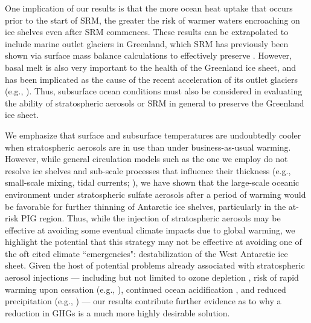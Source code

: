 \documentclass[grl]{AGUTeX}  %
\begin{document}
\begin{article}

One implication of our results is that the more ocean heat uptake that occurs prior to the start of SRM, the greater the risk of warmer waters encroaching on ice shelves even after SRM commences. These results can be extrapolated to include marine outlet glaciers in Greenland, which SRM has previously been shown via surface mass balance calculations to effectively preserve \citep{irvine09}. However, basal melt is also very important to the health of the Greenland ice sheet, and has been implicated as the cause of the recent acceleration of its outlet glaciers (e.g., \cite{dholland08}). Thus, subsurface ocean conditions must also be considered in evaluating the ability of stratospheric aerosols or SRM in general to preserve the Greenland ice sheet.

We emphasize that surface and subsurface temperatures are undoubtedly cooler when stratospheric aerosols are in use than under business-as-usual warming. However, while general circulation models such as the one we employ do not resolve ice shelves and sub-scale processes that influence their thickness (e.g., small-scale mixing, tidal currents; \cite{joughin11}), we have shown that the large-scale oceanic environment under stratospheric sulfate aerosols after a period of warming would be favorable for further thinning of Antarctic ice shelves, particularly in the at-risk PIG region. Thus, while the injection of stratospheric aerosols may be effective at avoiding some eventual climate impacts due to global warming, we highlight the potential that this strategy may not be effective at avoiding one of the oft cited climate ``emergencies": destabilization of the West Antarctic ice sheet. Given the host of potential problems already associated with stratospheric aerosol injections --- including but not limited to ozone depletion \citep{tilmes08,heckendorn09}, risk of rapid warming upon cessation (e.g., \cite{mccusker14}), continued ocean acidification \citep{feely04}, and reduced precipitation (e.g., \cite{bala08}) --- our results contribute further evidence as to why a reduction in GHGs is a much more highly desirable solution. %




\end{article}
\end{document}
